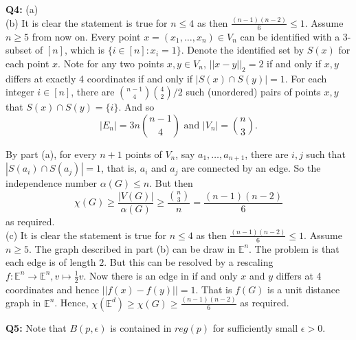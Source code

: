 \documentclass[12pt,reqno]{amsart}
\theoremstyle{definition}
\newcommand{\EE}{\mathbb{E}}
\begin{document}
\newpage
\noindent \textbf{Q4:} (a)\\


(b) It is clear the statement is true for $n\leq 4$ as then  $\frac{(n-1)(n-2)}{6}\leq 1$. Assume $n\geq 5$ from now on. Every point $x=(x_1,\dots,x_n)\in V_n$ can be identified with a 3-subset of $[n]$, which is $\{i\in [n]: x_i=1\}$. Denote the identified set by $S(x)$ for each point $x$. Note for any two points $x,y\in V_n$, $||x-y||_2=2$ if and only if  $x,y$ differs at exactly 4 coordinates if and only if $|S(x)\cap S(y)|=1$. For each integer $i\in [n]$, there are $\binom{n-1}{4} \binom{4}{2}/2$ such (unordered) pairs of points $x,y$ that $S(x)\cap S(y)=\{i\}$. And so $$|E_n| = 3n\binom{n-1}{4}  \mbox{ and } |V_n|=\binom{n}{3}.$$

By part (a), for every $n+1$ points of $V_n$, say $a_1,\dots,a_{n+1}$, there are $i,j$ such that $|S(a_i)\cap S(a_j)|=1$, that is, $a_i$ and $ a_j$ are connected by an edge. So the independence number $\alpha(G) \leq n$. But then $$\chi(G) \geq \frac{|V(G)|}{\alpha(G)} \geq \frac{\binom{n}{3}}{n} = \frac{(n-1)(n-2)}{6}$$ as required.\\


(c) It is clear the statement is true for $n\leq 4$ as then  $\frac{(n-1)(n-2)}{6}\leq 1$. Assume $n\geq 5$. The graph described in part (b) can be draw in $\EE^n$. The problem is that each edge is of length $2$. But this can be resolved by a rescaling $f:\EE^n \to \EE^n,  v\mapsto \frac{1}{2}v$. Now there is an edge in if and only $x$ and $y$ differs at 4 coordinates and hence  $||f(x)-f(y)||=1$. That is $f(G)$ is a unit distance graph in $\EE^n$. Hence, $\chi(\EE^d) \geq \chi(G) \geq   \frac{(n-1)(n-2)}{6}$ as required.

\newpage
\noindent \textbf{Q5:}  Note that $B(p,\epsilon)$ is contained in $reg(p)$ for sufficiently small $\epsilon >0$.
\end{document}
